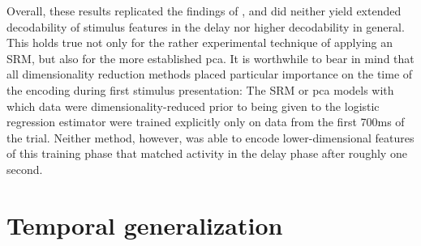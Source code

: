 Overall, these results replicated the findings of \citet{kaiserposter}, and did neither yield extended decodability of stimulus features in the delay nor higher decodability in general.
This holds true not only for the rather experimental technique of applying an \gls{SRM}, but also for the more established \gls{pca}.
It is worthwhile to bear in mind that all dimensionality reduction methods placed particular importance on the time of the encoding during first stimulus presentation:
The \gls{SRM} or \gls{pca} models with which data were dimensionality-reduced prior to being given to the logistic regression estimator were trained explicitly only on data from the first 700ms of the trial.
Neither method, however, was able to encode lower-dimensional features of this training phase that matched activity in the delay phase after roughly one second.


\section{Temporal generalization}
\label{temporal-generalization-analysis}

